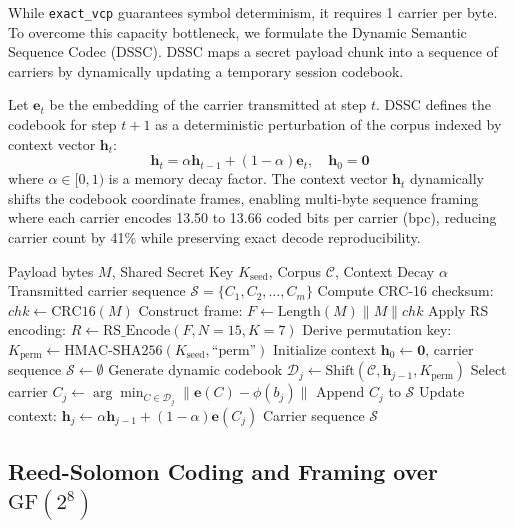 \documentclass[conference]{IEEEtran}
\begin{document}
While \texttt{exact\_vcp} guarantees symbol determinism, it requires 1 carrier per byte. To overcome this capacity bottleneck, we formulate the Dynamic Semantic Sequence Codec (DSSC). DSSC maps a secret payload chunk into a sequence of carriers by dynamically updating a temporary session codebook.

Let $\mathbf{e}_t$ be the embedding of the carrier transmitted at step $t$. DSSC defines the codebook for step $t+1$ as a deterministic perturbation of the corpus indexed by context vector $\mathbf{h}_t$:
\begin{equation}
\mathbf{h}_t = \alpha \mathbf{h}_{t-1} + (1-\alpha) \mathbf{e}_t, \quad \mathbf{h}_0 = \mathbf{0}
\end{equation}
where $\alpha \in [0, 1)$ is a memory decay factor. The context vector $\mathbf{h}_t$ dynamically shifts the codebook coordinate frames, enabling multi-byte sequence framing where each carrier encodes 13.50 to 13.66 coded bits per carrier (bpc), reducing carrier count by 41\% while preserving exact decode reproducibility.

\begin{algorithm}[t]
\caption{Dynamic Semantic Sequence Encoding}
\label{alg:dssc}
\begin{algorithmic}[1]
\REQUIRE Payload bytes $M$, Shared Secret Key $K_{\text{seed}}$, Corpus $\mathcal{C}$, Context Decay $\alpha$
\ENSURE Transmitted carrier sequence $\mathcal{S} = \{C_1, C_2, \dots, C_m\}$
\STATE Compute CRC-16 checksum: $chk \leftarrow \text{CRC16}(M)$
\STATE Construct frame: $F \leftarrow \text{Length}(M) \parallel M \parallel chk$
\STATE Apply RS encoding: $R \leftarrow \text{RS\_Encode}(F, N=15, K=7)$
\STATE Derive permutation key: $K_{\text{perm}} \leftarrow \text{HMAC-SHA256}(K_{\text{seed}}, \text{``perm''})$
\STATE Initialize context $\mathbf{h}_0 \leftarrow \mathbf{0}$, carrier sequence $\mathcal{S} \leftarrow \emptyset$
    \STATE Generate dynamic codebook $\mathcal{D}_j \leftarrow \text{Shift}(\mathcal{C}, \mathbf{h}_{j-1}, K_{\text{perm}})$
    \STATE Select carrier $C_j \leftarrow \arg\min_{C \in \mathcal{D}_j} \|\mathbf{e}(C) - \phi(b_j)\|$
    \STATE Append $C_j$ to $\mathcal{S}$
    \STATE Update context: $\mathbf{h}_j \leftarrow \alpha \mathbf{h}_{j-1} + (1-\alpha) \mathbf{e}(C_j)$
\ENDFOR
\RETURN Carrier sequence $\mathcal{S}$
\end{algorithmic}
\end{algorithm}

\subsection{Reed-Solomon Coding and Framing over $\text{GF}(2^8)$}
\end{document}
